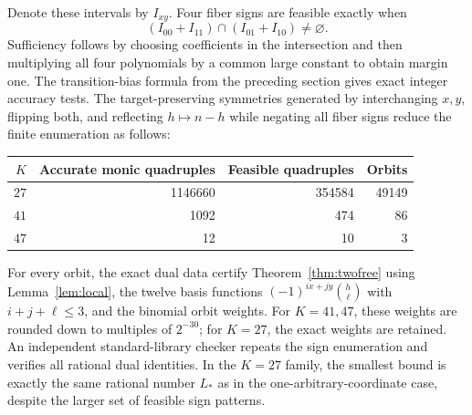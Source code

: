 \documentclass[11pt]{article}
\begin{document}
Denote these intervals by $I_{xy}$. Four fiber signs are feasible exactly when
\[
 (I_{00}+I_{11})\cap(I_{01}+I_{10})\ne\varnothing.
\]
Sufficiency follows by choosing coefficients in the intersection and then multiplying all four polynomials by a common large constant to obtain margin one. The transition-bias formula from the preceding section gives exact integer accuracy tests. The target-preserving symmetries generated by interchanging $x,y$, flipping both, and reflecting $h\mapsto n-h$ while negating all fiber signs reduce the finite enumeration as follows:
\begin{center}
\begin{tabular}{rrrr}\toprule
$K$& Accurate monic quadruples & Feasible quadruples & Orbits\\\midrule
$27$&1146660&354584&49149\\
$41$&1092&474&86\\
$47$&12&10&3\\\bottomrule
\end{tabular}
\end{center}
For every orbit, the exact dual data certify Theorem~\ref{thm:twofree} using Lemma~\ref{lem:local}, the twelve basis functions $(-1)^{ix+jy}\binom h\ell$ with $i+j+\ell\le3$, and the binomial orbit weights. For $K=41,47$, these weights are rounded down to multiples of $2^{-30}$; for $K=27$, the exact weights are retained. An independent standard-library checker repeats the sign enumeration and verifies all rational dual identities. In the $K=27$ family, the smallest bound is exactly the same rational number $L_*$ as in the one-arbitrary-coordinate case, despite the larger set of feasible sign patterns.
\end{document}
